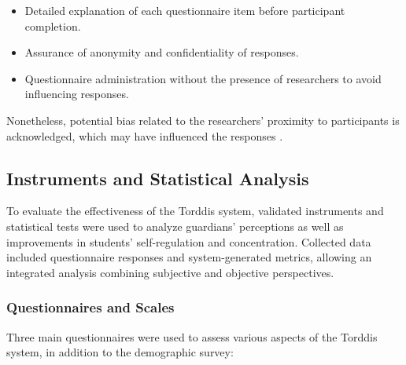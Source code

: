                 \begin{itemize}
                    \item Detailed explanation of each questionnaire item before participant completion.
                    
                    \item Assurance of anonymity and confidentiality of responses.
                    
                    \item Questionnaire administration without the presence of researchers to avoid influencing responses.
                \end{itemize}
                
                Nonetheless, potential bias related to the researchers’ proximity to participants is acknowledged, which may have influenced the responses \citep{DiPietro2025Meta}.
                
                \subsection{Instruments and Statistical Analysis}
                To evaluate the effectiveness of the Torddis system, validated instruments and statistical tests were used to analyze guardians’ perceptions as well as improvements in students’ self-regulation and concentration. Collected data included questionnaire responses and system-generated metrics, allowing an integrated analysis combining subjective and objective perspectives.
                
                \subsubsection{Questionnaires and Scales}
                Three main questionnaires were used to assess various aspects of the Torddis system, in addition to the demographic survey:
                

